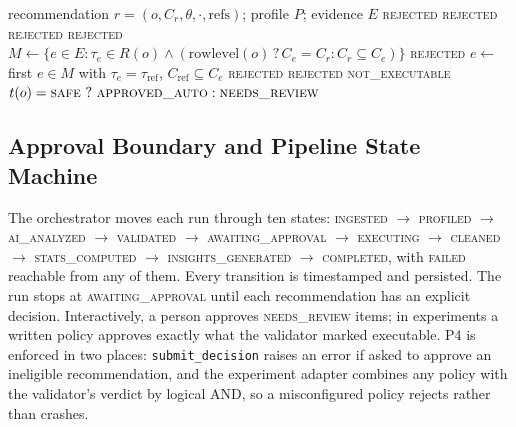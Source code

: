 \begin{algorithm}[t]
\caption{Evidence-based validation $V(r;P,E)$}
\label{alg:validator}
\footnotesize
\begin{algorithmic}[1]
\Require recommendation $r=(o,C_r,\theta,\cdot,\mathrm{refs})$; profile $P$; evidence $E$
 \Return \textsc{rejected} \EndIf
{} \Return \textsc{rejected} \EndIf
{} \Return \textsc{rejected}\EndIf
{} \Return \textsc{rejected}\EndIf
{}
  \State $M\gets\{e\in E:\tau_e\in R(o)\wedge(\mathrm{rowlevel}(o)\,?\,C_e{=}C_r : C_r{\subseteq}C_e)\}$
   \Return \textsc{rejected} \EndIf
    \State $e\gets$ first $e\in M$ with $\tau_e=\tau_{\mathrm{ref}}$, $C_{\mathrm{ref}}\subseteq C_e$
     \Return \textsc{rejected}\EndIf
  \EndFor
   \Return \textsc{rejected}\EndIf
\EndIf
{} \Return \textsc{not\_executable}\EndIf
\State \Return $t(o)=\textsc{safe}\ ?\ \textsc{approved\_auto} : \textsc{needs\_review}$
\end{algorithmic}
\end{algorithm}

\subsection{Approval Boundary and Pipeline State Machine}
The orchestrator moves each run through ten states: \textsc{ingested} $\to$\allowbreak{} \textsc{profiled} $\to$\allowbreak{} \textsc{ai\_analyzed} $\to$\allowbreak{} \textsc{validated} $\to$\allowbreak{} \textsc{awaiting\_approval} $\to$\allowbreak{} \textsc{executing} $\to$\allowbreak{} \textsc{cleaned} $\to$\allowbreak{} \textsc{stats\_computed} $\to$\allowbreak{} \textsc{insights\_generated} $\to$\allowbreak{} \textsc{completed}, with \textsc{failed} reachable from any of them. Every transition is timestamped and persisted. The run stops at \textsc{awaiting\_approval} until each recommendation has an explicit decision. Interactively, a person approves \textsc{needs\_review} items; in experiments a written policy approves exactly what the validator marked executable. P4 is enforced in two places: \texttt{submit\_decision} raises an error if asked to approve an ineligible recommendation, and the experiment adapter combines any policy with the validator's verdict by logical AND, so a misconfigured policy rejects rather than crashes.

